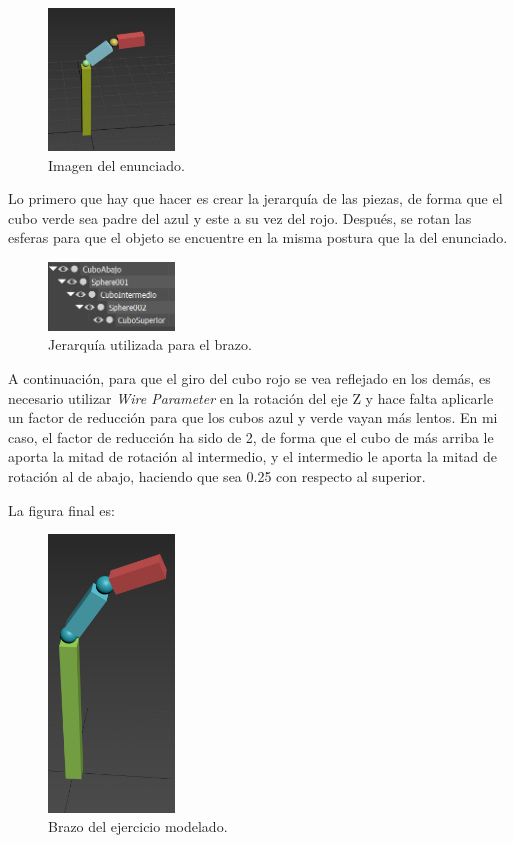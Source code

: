 \documentclass[]{article}
\begin{document}
\begin{figure}[H]
   \centering
   \includegraphics[width=0.3\textwidth]{imagenes/pag42.png}
   \caption{Imagen del enunciado\cite{diapos}.}
\end{figure}

Lo primero que hay que hacer es crear la jerarquía de las piezas, de forma que el cubo verde sea padre del azul y este a su vez del rojo. Después, se rotan las esferas para que el objeto se encuentre en la misma postura que la del enunciado.

\begin{figure}[H]
   \centering
   \includegraphics[width=0.3\textwidth]{imagenes/jerarquia.png}
   \caption{Jerarquía utilizada para el brazo.}
\end{figure}

A continuación, para que el giro del cubo rojo se vea reflejado en los demás, es necesario utilizar \textit{Wire Parameter} en la rotación del eje Z y hace falta aplicarle un factor de reducción para que los cubos azul y verde vayan más lentos. En mi caso, el factor de reducción ha sido de 2, de forma que el cubo de más arriba le aporta la mitad de rotación al intermedio, y el intermedio le aporta la mitad de rotación al de abajo, haciendo que sea 0.25 con respecto al superior.

\bigskip
\newpage

La figura final es:

\begin{figure}[H]
   \centering
   \includegraphics[width=0.3\textwidth]{imagenes/brazo1mio.png}
   \caption{Brazo del ejercicio modelado.}
\end{figure}
\end{document}
